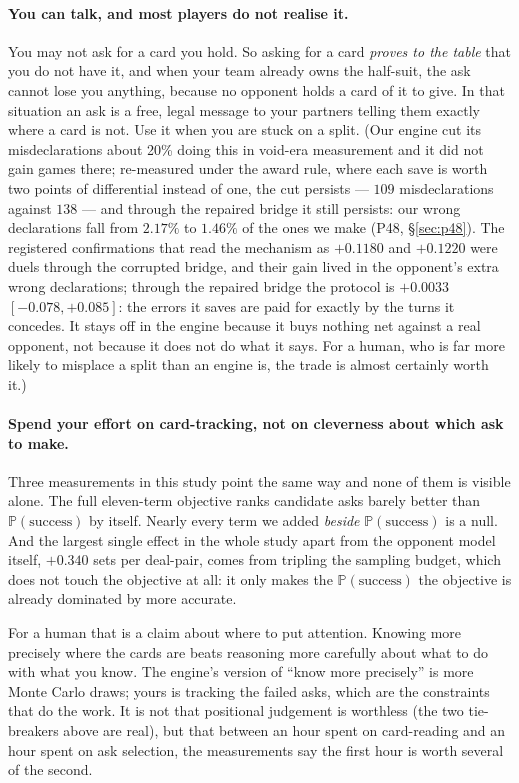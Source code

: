 \documentclass[11pt,letterpaper]{article}
\newcommand{\Prob}{\ensuremath{\mathbb{P}}}
\begin{document}
\paragraph{You can talk, and most players do not realise it.} You may not ask
for a card you hold. So asking for a card \emph{proves to the table} that you do
not have it, and when your team already owns the half-suit, the ask cannot
lose you anything, because no opponent holds a card of it to give. In that
situation an ask is a free, legal message to your partners telling them exactly
where a card is not. Use it when you are stuck on a split. (Our engine cut
its misdeclarations about 20\% doing this in void-era measurement and it did
not gain games there; re-measured under the award rule, where each save is
worth two points of differential instead of one, the cut persists --- $109$
misdeclarations against $138$ --- and through the repaired bridge it still
persists: our wrong declarations fall from $2.17\%$ to $1.46\%$ of the ones we
make (P48, \S\ref{sec:p48}). The registered confirmations that read the
mechanism as $+0.1180$ and $+0.1220$ were duels through the corrupted bridge,
and their gain lived in the opponent's extra wrong declarations; through the
repaired bridge the protocol is $+0.0033$ $[-0.078, +0.085]$: the errors it
saves are paid for exactly by the turns it concedes. It stays off in the
engine because it buys nothing net against a real opponent, not because it
does not do what it says. For a human, who is far more likely to misplace a
split than an engine is, the trade is almost certainly worth it.)

\paragraph{Spend your effort on card-tracking, not on cleverness about which ask
to make.} Three measurements in this study point the same way and none of them
is visible alone. The full eleven-term objective ranks candidate asks barely
better than $\Prob(\text{success})$ by itself. Nearly every term we added
\emph{beside} $\Prob(\text{success})$ is a null. And the largest single effect in
the whole study apart from the opponent model itself, $+0.340$ sets per
deal-pair, comes from tripling the sampling budget, which does not touch the objective at all: it only makes the
$\Prob(\text{success})$ the objective is already dominated by more accurate.

For a human that is a claim about where to put attention. Knowing more precisely
where the cards are beats reasoning more carefully about what to do with what
you know. The engine's version of ``know more precisely'' is more Monte Carlo
draws; yours is tracking the failed asks, which are the constraints that do the
work. It is not that positional judgement is worthless (the two tie-breakers
above are real), but that between an hour spent on card-reading and an hour
spent on ask selection, the measurements say the first hour is worth several of
the second.
\end{document}

